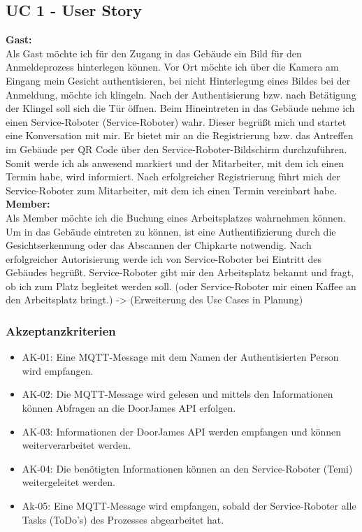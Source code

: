 \documentclass[
  ngerman           %
  ,twoside          %
  ,11pt
  ,pdftex
]{report}
\begin{document}
\subsection*{UC 1 - User Story}
\textbf{Gast:}
\\
Als Gast möchte ich für den Zugang in das Gebäude ein Bild für den Anmeldeprozess hinterlegen können. Vor Ort möchte ich über die Kamera 
am Eingang mein Gesicht authentisieren, bei nicht Hinterlegung eines Bildes bei der Anmeldung, möchte ich klingeln. Nach der 
Authentisierung bzw. nach Betätigung der Klingel soll sich die Tür öffnen. Beim Hineintreten in das Gebäude nehme ich einen Service-Roboter 
(Service-Roboter) wahr. Dieser begrüßt mich und startet eine Konversation mit mir. Er bietet mir an die Registrierung bzw. das Antreffen im Gebäude 
per QR Code über den Service-Roboter-Bildschirm durchzuführen. Somit werde ich als anwesend markiert und der Mitarbeiter, mit dem ich einen Termin 
habe, wird informiert. Nach erfolgreicher Registrierung führt mich der Service-Roboter zum Mitarbeiter, mit dem ich einen Termin vereinbart habe.
\\
\linebreak
\textbf{Member:}
\\
Als Member möchte ich die Buchung eines Arbeitsplatzes wahrnehmen können. Um in das Gebäude eintreten zu können, ist eine Authentifizierung durch 
die Gesichtserkennung oder das Abscannen der Chipkarte notwendig. Nach erfolgreicher Autorisierung werde ich von Service-Roboter bei Eintritt des Gebäudes 
begrüßt. Service-Roboter gibt mir den Arbeitsplatz bekannt und fragt, ob ich zum Platz begleitet werden soll. 
(oder Service-Roboter mir einen Kaffee an den Arbeitsplatz bringt.) -> (Erweiterung des Use Cases in Planung)

\subsubsection*{Akzeptanzkriterien}
\begin{itemize}
    \item AK-01: Eine MQTT-Message mit dem Namen der Authentisierten Person wird empfangen.
    \item AK-02: Die MQTT-Message wird gelesen und mittels den Informationen können Abfragen an die DoorJames API erfolgen.
    \item AK-03: Informationen der DoorJames API werden empfangen und können weiterverarbeitet werden. 
    \item AK-04: Die benötigten Informationen können an den Service-Roboter (Temi) weitergeleitet werden.
    \item Ak-05: Eine MQTT-Message wird empfangen, sobald der Service-Roboter alle Tasks (ToDo's)  des Prozesses abgearbeitet hat. 
\end{itemize}
\end{document}
